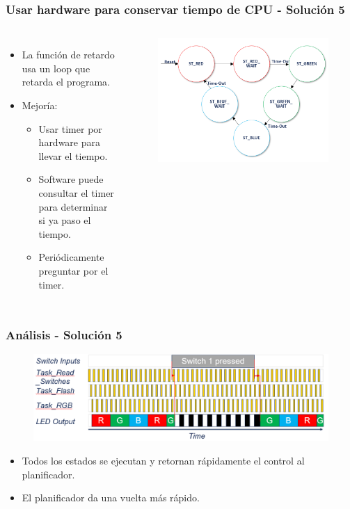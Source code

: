\documentclass[10.5pt,scale=1.0,t,aspectratio=169,hyperref={pdfpagelabels=false}]{beamer}
\begin{document}
\begin{frame}
	\frametitle{Usar hardware para conservar tiempo de CPU - Solución 5}
	\begin{columns}
		\begin{itemize}
			\item La función de retardo usa un loop que retarda el programa. 
			\item Mejoría:
			\begin{itemize}
				\item Usar timer por hardware para llevar el tiempo.
				\item Software puede consultar el timer para determinar si ya paso el tiempo.
				\item Periódicamente preguntar por el timer. 
			\end{itemize}
		\end{itemize}
		\begin{figure}
			\centering
			\includegraphics[scale=0.3]{17_FSMHardware}
		\end{figure}
	\end{columns}
\end{frame}
\begin{frame}
	\frametitle{Análisis - Solución 5}
	\begin{figure}
		\centering
		\includegraphics[scale=0.5]{17_TimingSolution5}
	\end{figure}
	\begin{itemize}
		\item Todos los estados se ejecutan y retornan rápidamente el control al planificador.
		\item El planificador da una vuelta más rápido. 
	\end{itemize}
\end{frame}
\end{document}
